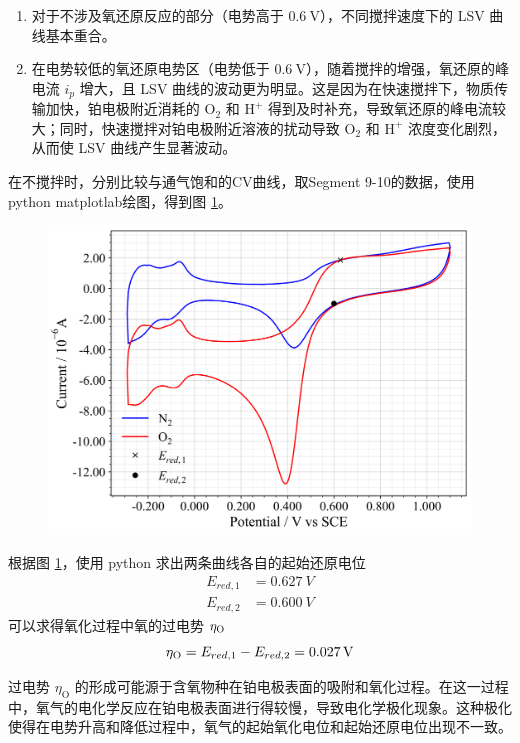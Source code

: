 \begin{enumerate}
    \item 对于不涉及氧还原反应的部分（电势高于 $0.6 \mathrm{~V}$），不同搅拌速度下的 LSV 曲线基本重合。
    \item 在电势较低的氧还原电势区（电势低于 $0.6 \mathrm{~V}$），随着搅拌的增强，氧还原的峰电流 $i_p$ 增大，且 LSV 曲线的波动更为明显。这是因为在快速搅拌下，物质传输加快，铂电极附近消耗的 $\mathrm{O}_2$ 和 $\mathrm{H}^{+}$ 得到及时补充，导致氧还原的峰电流较大；同时，快速搅拌对铂电极附近溶液的扰动导致 $\mathrm{O}_2$ 和 $\mathrm{H}^{+}$ 浓度变化剧烈，从而使 LSV 曲线产生显著波动。
\end{enumerate}

在不搅拌时，分别比较与通气饱和的CV曲线，取Segment 9-10的数据，使用python matplotlab绘图，得到图 \ref{fig:3}。

\begin{figure}[htbp]
    \centering
    \includegraphics[width=.75\textwidth]{figures2/3.png}
    \label{fig:3}
\end{figure}

根据图 \ref{fig:3}，使用 python 求出两条曲线各自的起始还原电位
\begin{align*}
    E_{red,1} &= \SI{0.627}{V}\\
    E_{red,2} &= \SI{0.600}{V}
\end{align*}
可以求得氧化过程中氧的过电势 $\eta_{\rm O}$
$$
\eta_{\rm O} = E_{red,1} - E_{red,2}=\SI{0.027}{V}
$$

过电势 $\eta_{\mathrm{O}}$ 的形成可能源于含氧物种在铂电极表面的吸附和氧化过程。在这一过程中，氧气的电化学反应在铂电极表面进行得较慢，导致电化学极化现象。这种极化使得在电势升高和降低过程中，氧气的起始氧化电位和起始还原电位出现不一致。


